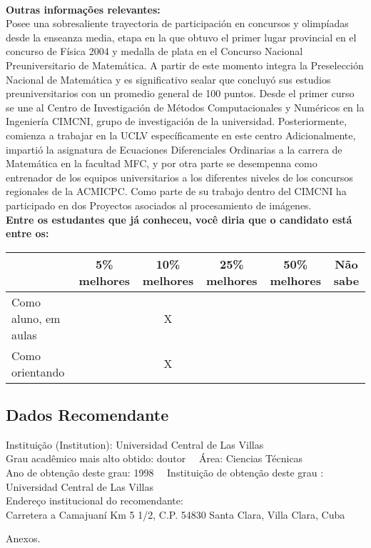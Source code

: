 \documentclass[11pt]{article}
\begin{document}
\\
\textbf{Outras informações relevantes:} \\Posee una sobresaliente trayectoria de participación en concursos y olimpíadas desde la enseanza media, etapa en la que obtuvo el primer lugar provincial en el concurso de Física 2004 y medalla de plata en el Concurso Nacional Preuniversitario de Matemática. A partir de este momento integra la Preselección Nacional de Matemática y es significativo sealar que concluyó sus estudios preuniversitarios con un promedio general de 100 puntos.
Desde el primer curso se une al Centro de Investigación de Métodos Computacionales y Numéricos en la Ingeniería CIMCNI, grupo de investigación de la universidad. Posteriormente, comienza a trabajar en la UCLV específicamente en este centro Adicionalmente, impartió la asignatura de Ecuaciones Diferenciales Ordinarias a la carrera de Matemática en la facultad MFC, y por otra parte se desempenna como entrenador de los equipos universitarios a los diferentes niveles de los concursos regionales de la  ACMICPC. Como parte de su trabajo dentro del CIMCNI ha participado en dos Proyectos asociados al procesamiento de imágenes.
\\[0.3cm]
\textbf{Entre os estudantes que já conheceu, você diria que o candidato está entre os:}
\\
\begin{tabular}{|l|c|c|c|c|c|}
\hline
 & 5\% melhores & 10\% melhores & 25\% melhores & 50\% melhores & Não sabe \\
\hline
Como aluno, em aulas &  & X &  &  & \\
\hline
Como orientando &  & X &  &  & \\
\hline
\end{tabular}
\subsection*{Dados Recomendante} 
	Instituição (Institution): Universidad Central de Las Villas
\\ 
	Grau acadêmico mais alto obtido: doutor
	\ \ Área: Ciencias Técnicas
	\\
	Ano de obtenção deste grau: 1998
	\ \ 
	Instituição de obtenção deste grau : Universidad Central de Las Villas
	\\ 
	Endereço institucional do recomendante: \\ Carretera a Camajuaní Km 5 1/2, C.P. 54830 Santa Clara, Villa Clara, Cuba 
\begin{center}
Anexos.
\end{center}
\end{document}
